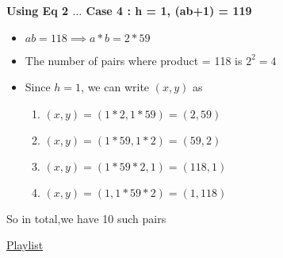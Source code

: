 \textbf{Using Eq 2 $\ldots$ Case 4 : h = 1, (ab+1) = 119}
\begin{itemize}
    \item $ab = 118 \implies a*b = 2 * 59$
    \item The number of pairs where product = 118 is $2^2 = 4$
    \item Since $h = 1$, we can write $(x,y)$ as 
    \begin{enumerate}
        \item $(x,y) = (1 * 2, 1 * 59) = (2,59)$
        \item $(x,y) = (1 * 59, 1 * 2) = (59,2)$
        \item $(x,y) = (1 * 59 * 2, 1) = (118,1)$
        \item $(x,y) = (1,1 * 59 * 2) = (1,118)$
    \end{enumerate}
\end{itemize}

So in total,we have 10 such pairs


\href{https://www.youtube.com/watch?v=JyN6EROdhrw&list=PLG4bwc5fquzgmP5BLHrRDwBueer0udDjc&index=38}{Playlist}